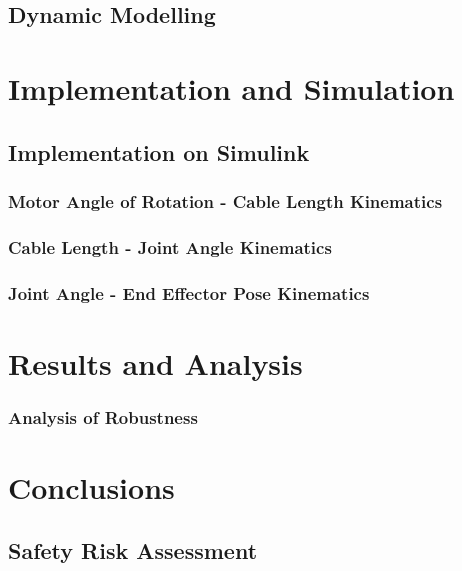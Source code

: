 \documentclass[a4paper,12pt]{report}
\begin{document}
\section{Dynamic Modelling}




\chapter{Implementation and Simulation}


\section{Implementation on Simulink}

\subsection{Motor Angle of Rotation - Cable Length Kinematics}

\subsection{Cable Length - Joint Angle Kinematics}


\subsection{Joint Angle - End Effector Pose Kinematics}




\chapter{Results and Analysis}
\subsection{Analysis of Robustness}

\chapter{Conclusions}

\section{Safety Risk Assessment}
\end{document}
